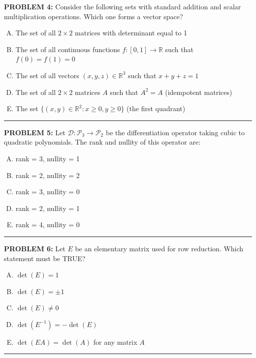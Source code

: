 \documentclass[12pt]{amsart}
\newcommand{\divider}{
  \vspace{-1em} %
  \noindent
  \raisebox{-0.15ex}{\textbullet}%
  \hspace{0.5em}%
  \rule[0.5ex]{0.95\textwidth}{1.0pt}%
  \hspace{0.5em}%
  \raisebox{-0.15ex}{\textbullet}%
  \vspace{0em} %
}
\begin{document}
\newpage

{\bf PROBLEM 4:}
Consider the following sets with standard addition and scalar multiplication operations. Which one forms a vector space?

\begin{enumerate}[(A)]
\item The set of all $2 \times 2$ matrices with determinant equal to 1
\item The set of all continuous functions $f: [0,1] \to \mathbb{R}$ such that $f(0) = f(1) = 0$
\item The set of all vectors $(x, y, z) \in \mathbb{R}^3$ such that $x + y + z = 1$
\item The set of all $2 \times 2$ matrices $A$ such that $A^2 = A$ (idempotent matrices)
\item The set $\{(x, y) \in \mathbb{R}^2 : x \geq 0, y \geq 0\}$ (the first quadrant)
\end{enumerate}
\divider



{\bf PROBLEM 5:}
Let ${\mathcal D}: \mathcal{P}_3 \to \mathcal{P}_2$ be the differentiation operator taking cubic to quadratic polynomials. 
The rank and nullity of this operator are:
\begin{enumerate}[(A)]
\item rank = 3, nullity = 1
\item rank = 2, nullity = 2
\item rank = 3, nullity = 0
\item rank = 2, nullity = 1
\item rank = 4, nullity = 0
\end{enumerate}
\divider


{\bf PROBLEM 6:}
Let $E$ be an elementary matrix used for row reduction. Which statement must be TRUE?

\begin{enumerate}[(A)]
\item $\det(E) = 1$
\item $\det(E) = \pm 1$
\item $\det(E) \neq 0$
\item $\det(E^{-1}) = -\det(E)$
\item $\det(EA) = \det(A)$ for any matrix $A$
\end{enumerate}
\divider
\end{document}

